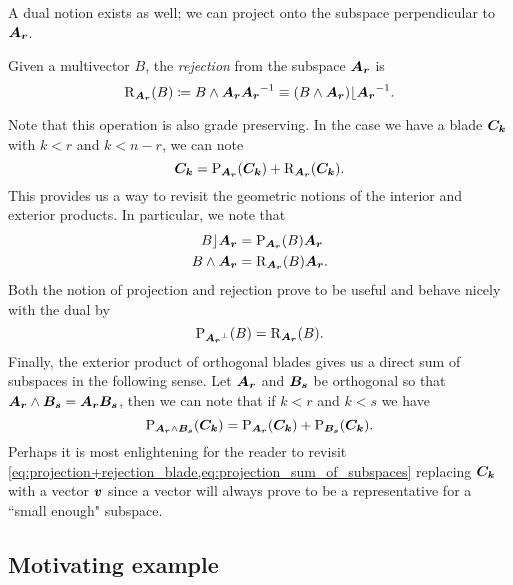 A dual notion exists as well; we can project onto the subspace perpendicular to $\boldsymbol{A_r}$.
\begin{definition}
Given a multivector $B$, the \emph{rejection} from the subspace $\boldsymbol{A_r}$ is
\begin{equation}
\label{eq:rejection}
\operatorname{R}_{\boldsymbol{A_r}}(B) \coloneqq B \wedge \boldsymbol{A_r} \boldsymbol{A_r}^{-1} \equiv (B\wedge \boldsymbol{A_r})\lfloor \boldsymbol{A_r}^{-1}.
\end{equation}
\end{definition}
Note that this operation is also grade preserving. In the case we have a blade $\boldsymbol{C_k}$ with $k<r$ and $k<n-r$, we can note
\begin{equation}
\label{eq:projection+rejection_blade}
\boldsymbol{C_k}=\operatorname{P}_{\boldsymbol{A_r}}(\boldsymbol{C_k}) + \operatorname{R}_{\boldsymbol{A_r}}(\boldsymbol{C_k}).
\end{equation}
This provides us a way to revisit the geometric notions of the interior and exterior products. In particular, we note that
\begin{align}
\label{eq:projection_inner_product}
    B \rfloor \boldsymbol{A_r} &= \operatorname{P}_{\boldsymbol{A_r}} (B) \boldsymbol{A_r}\\
    B \wedge \boldsymbol{A_r} &= \operatorname{R}_{\boldsymbol{A_r}}(B) \boldsymbol{A_r}.
\end{align}
Both the notion of projection and rejection prove to be useful and behave nicely with the dual by
\begin{equation}
\label{eq:projection_rejection_duality}
\operatorname{P}_{\boldsymbol{A_r}^\perp}(B) = \operatorname{R}_{\boldsymbol{A_r}}(B).
\end{equation}
Finally, the exterior product of orthogonal blades gives us a direct sum of subspaces in the following sense. Let $\boldsymbol{A_r}$ and $\boldsymbol{B_s}$ be orthogonal so that $\boldsymbol{A_r}\wedge \boldsymbol{B_s}=\boldsymbol{A_r}\boldsymbol{B_s}$, then we can note that if $k<r$ and $k<s$ we have
\begin{equation}
\label{eq:projection_sum_of_subspaces}
    \operatorname{P}_{\boldsymbol{A_r}\wedge \boldsymbol{B_s}} (\boldsymbol{C_k}) = \operatorname{P}_{\boldsymbol{A_r}}(\boldsymbol{C_k}) + \operatorname{P}_{\boldsymbol{B_s}}(\boldsymbol{C_k}).
\end{equation}
Perhaps it is most enlightening for the reader to revisit \cref{eq:projection+rejection_blade,eq:projection_sum_of_subspaces} replacing $\boldsymbol{C_k}$ with a vector $\boldsymbol{v}$ since a vector will always prove to be a representative for a ``small enough" subspace.


\subsection{Motivating example}
\label{subsubsec:motivating_example}

